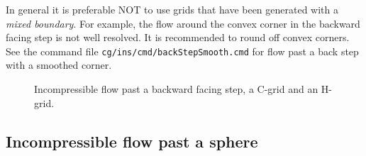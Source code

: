 \documentclass{article}
\begin{document}
In general it is preferable NOT to use grids that have been generated with a {\sl mixed boundary}. 
For example, the flow around the convex corner in the backward facing step is not well resolved. 
It is recommended to round off convex corners. See the command file {\tt cg/ins/cmd/backStepSmooth.cmd} 
for flow past a back step with a smoothed corner.

{
\begin{figure}[hbt]
\newcommand{\figWidtha}{8.cm}
\newcommand{\trimfiga}[2]{\trimPlot{#1}{#2}{.02}{.02}{.275}{.4}}
\newcommand{\figWidthb}{8.25cm}
\newcommand{\trimfigb}[2]{\trimPlot{#1}{#2}{.14}{.12}{.35}{.35}}
\newcommand{\figWidthc}{8.cm}
\newcommand{\trimfigc}[2]{\trimPlot{#1}{#2}{.02}{.13}{.05}{.3}}
\newcommand{\figWidthd}{8.cm}
\newcommand{\trimfigd}[2]{\trimPlot{#1}{#2}{.02}{.13}{.125}{.3}}
\begin{center}
\end{center} 
\caption{Incompressible flow past a backward facing step, a C-grid and an H-grid.}
\end{figure}
}




\subsection{Incompressible flow past a sphere}
\end{document}
